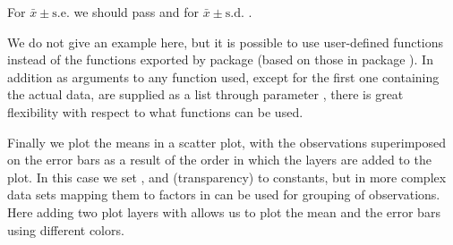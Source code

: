 \documentclass[krantz2]{krantz}\usepackage{knitr}%
\begin{document}
\begin{knitrout}\footnotesize
{}\color{fgcolor}\begin{kframe}
\begin{alltt}
  \hlstd{(} \hlstd{=} \hlstd{,}
                \hlstd{=} \hlstd{(} \hlstd{=} \hlstd{),}
                \hlstd{=} \hlstd{,}  \hlstd{=} \hlstd{,}  \hlstd{=} \hlstd{)}
\end{alltt}
\end{kframe}
\end{knitrout}

For $\bar{x} \pm \mathrm{s.e.}$ we should pass  and for $\bar{x} \pm \mathrm{s.d.}$ .

\begin{knitrout}\footnotesize
{}\color{fgcolor}\begin{kframe}
\begin{alltt}
  \hlstd{(} \hlstd{=} \hlstd{,}
                \hlstd{=} \hlstd{,}  \hlstd{=} \hlstd{,}  \hlstd{=} \hlstd{)}
\end{alltt}
\end{kframe}
\end{knitrout}

We do not give an example here, but it is possible to use user-defined functions instead of the functions exported by package \ggplot (based on those in package \Hmisc). In addition as arguments to any function used, except for the first one containing the actual data, are supplied as a list through parameter , there is great flexibility with respect to what functions can be used.

Finally we plot the means in a scatter plot, with the observations superimposed on the error bars as a result of the order in which the layers are added to the plot. In this case we set ,  and  (transparency) to constants, but in more complex data sets mapping them to factors in  can be used for grouping of observations. Here adding two plot layers with  allows us to plot the mean and the error bars using different colors.
\end{document}
